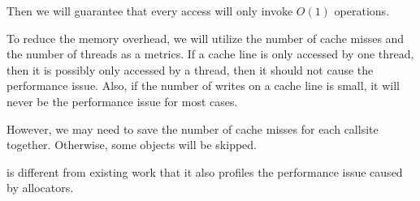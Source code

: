  Then we will guarantee that every access will only invoke $O(1)$ operations. 


To reduce the memory overhead, we will utilize the number of cache misses and the number of threads as a metrics. If a cache line is only accessed by one thread, then it is possibly only accessed by a thread, then it should not cause the performance issue. 
Also, if the number of writes on a cache line is small, it will never be the performance issue for most cases. 

However, we may need to save the number of cache misses for each callsite together. Otherwise, some objects will be skipped. 


\NP{} is different from existing work that it also profiles the performance issue caused by allocators.  






